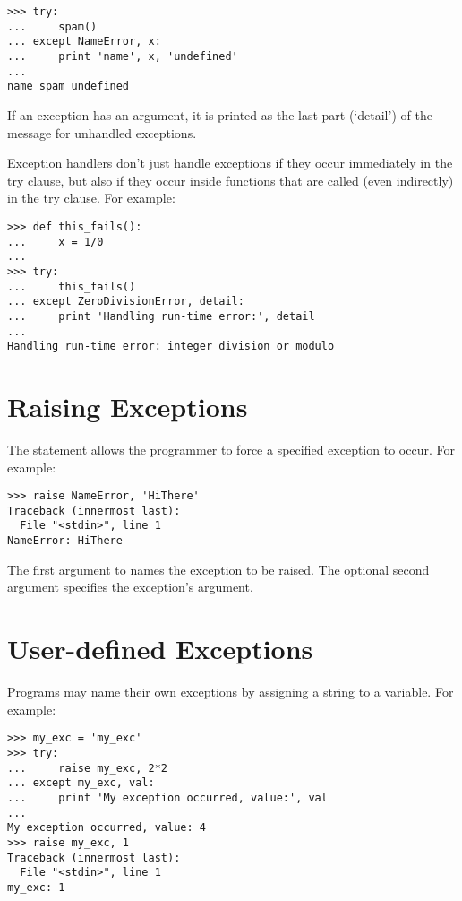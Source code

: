 \documentclass{manual}
\begin{document}
\begin{verbatim}
>>> try:
...     spam()
... except NameError, x:
...     print 'name', x, 'undefined'
... 
name spam undefined
\end{verbatim}

If an exception has an argument, it is printed as the last part
(`detail') of the message for unhandled exceptions.

Exception handlers don't just handle exceptions if they occur
immediately in the try clause, but also if they occur inside functions
that are called (even indirectly) in the try clause.
For example:

\begin{verbatim}
>>> def this_fails():
...     x = 1/0
... 
>>> try:
...     this_fails()
... except ZeroDivisionError, detail:
...     print 'Handling run-time error:', detail
... 
Handling run-time error: integer division or modulo
\end{verbatim}


\section{Raising Exceptions}
\label{raising}

The  statement allows the programmer to force a
specified exception to occur.
For example:

\begin{verbatim}
>>> raise NameError, 'HiThere'
Traceback (innermost last):
  File "<stdin>", line 1
NameError: HiThere
\end{verbatim}

The first argument to  names the exception to be
raised.  The optional second argument specifies the exception's
argument.


\section{User-defined Exceptions}
\label{userExceptions}

Programs may name their own exceptions by assigning a string to a
variable.
For example:

\begin{verbatim}
>>> my_exc = 'my_exc'
>>> try:
...     raise my_exc, 2*2
... except my_exc, val:
...     print 'My exception occurred, value:', val
... 
My exception occurred, value: 4
>>> raise my_exc, 1
Traceback (innermost last):
  File "<stdin>", line 1
my_exc: 1
\end{verbatim}
\end{document}
